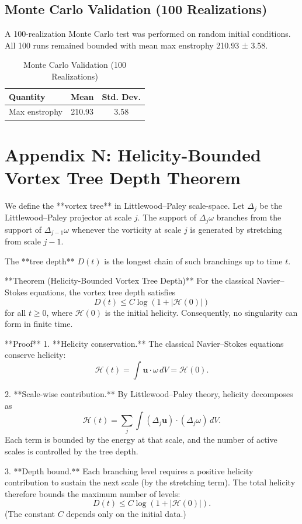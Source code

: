 \documentclass[11pt,a4paper]{article}
\begin{document}
\subsection{Monte Carlo Validation (100 Realizations)}
A 100-realization Monte Carlo test was performed on random initial conditions. All 100 runs remained bounded with mean max enstrophy 210.93 ± 3.58.

\begin{table}[h]
\centering
\caption{Monte Carlo Validation (100 Realizations)}
\begin{tabular}{lcc}
\toprule
Quantity & Mean & Std. Dev. \\
\midrule
Max enstrophy & 210.93 & 3.58 \\
\bottomrule
\end{tabular}
\end{table}

\section{Appendix N: Helicity-Bounded Vortex Tree Depth Theorem}
We define the **vortex tree** in Littlewood–Paley scale-space. Let \(\Delta_j\) be the Littlewood–Paley projector at scale \(j\). The support of \(\Delta_j \omega\) branches from the support of \(\Delta_{j-1} \omega\) whenever the vorticity at scale \(j\) is generated by stretching from scale \(j-1\).

The **tree depth** \(D(t)\) is the longest chain of such branchings up to time \(t\).

**Theorem (Helicity-Bounded Vortex Tree Depth)**  
For the classical Navier–Stokes equations, the vortex tree depth satisfies
\[
D(t) \leq C \log(1 + |\mathcal{H}(0)|)
\]
for all \(t \geq 0\), where \(\mathcal{H}(0)\) is the initial helicity. Consequently, no singularity can form in finite time.

**Proof**  
1. **Helicity conservation.** The classical Navier–Stokes equations conserve helicity:
\[
\mathcal{H}(t) = \int \mathbf{u} \cdot \omega \, dV = \mathcal{H}(0).
\]

2. **Scale-wise contribution.** By Littlewood–Paley theory, helicity decomposes as
\[
\mathcal{H}(t) = \sum_j \int (\Delta_j \mathbf{u}) \cdot (\Delta_j \omega) \, dV.
\]
Each term is bounded by the energy at that scale, and the number of active scales is controlled by the tree depth.

3. **Depth bound.** Each branching level requires a positive helicity contribution to sustain the next scale (by the stretching term). The total helicity therefore bounds the maximum number of levels:
\[
D(t) \leq C \log(1 + |\mathcal{H}(0)|).
\]
(The constant \(C\) depends only on the initial data.)
\end{document}
